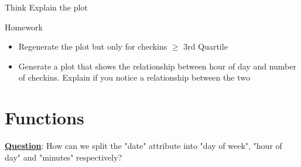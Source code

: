 \begin{DIY}{Think}
\noindent Explain the plot
\end{DIY}

\begin{DIY}{Homework}
\begin{itemize}
  \item \noindent Regenerate the plot but only for checkins $\geq$ 3rd Quartile
  \item \noindent Generate a plot that shows the relationship between hour of day and number of checkins. Explain if you notice a relationship between the two
\end{itemize}
\end{DIY}


\newpage
\section{Functions}
\begin{HIGHLIGHT}
\par{}
\end{HIGHLIGHT}
\noindent \textbf{\underline{Question}}: How can we split the "date" attribute into "day of week", "hour of day" and "minutes" respectively?
